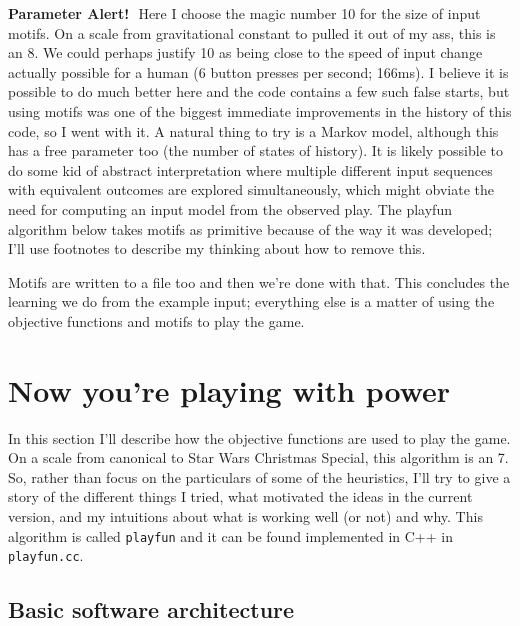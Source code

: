 \documentclass[twocolumn]{article}
\newcommand\parameteralert[1]{
  {\bf Parameter Alert!}\,\, #1
}
\begin{document}
\parameteralert{Here I choose the magic number 10 for the size of input
  motifs. On a scale from gravitational constant to pulled it out of
  my ass, this is an 8. We could perhaps justify 10 as being close to
  the speed of input change actually possible for a human (6 button
  presses per second; 166ms). I believe it is possible to do much
  better here and the code contains a few such false starts, but using
  motifs was one of the biggest immediate improvements in the history
  of this code, so I went with it. A natural thing to try is a Markov
  model, although this has a free parameter too (the number of states
  of history). It is likely possible to do some kid of abstract
  interpretation where multiple different input sequences with
  equivalent outcomes are explored simultaneously, which might obviate
  the need for computing an input model from the observed play. The
  playfun algorithm below takes motifs as primitive because of the way
  it was developed; I'll use footnotes to describe my thinking about
  how to remove this.}

Motifs are written to a file too and then we're done with that. This
concludes the learning we do from the example input; everything else
is a matter of using the objective functions and motifs to play the
game.

\section{Now you're playing with power} \label{sec:playfun}

In this section I'll describe how the objective functions are used to
play the game. On a scale from canonical to Star Wars Christmas
Special, this algorithm is an 7. So, rather than focus on the
particulars of some of the heuristics, I'll try to give a story of the
different things I tried, what motivated the ideas in the current
version, and my intuitions about what is working well (or not) and
why. This algorithm is called {\tt playfun} and it can be found
implemented in C++ in {\tt playfun.cc}.

\subsection{Basic software architecture}
\end{document}
